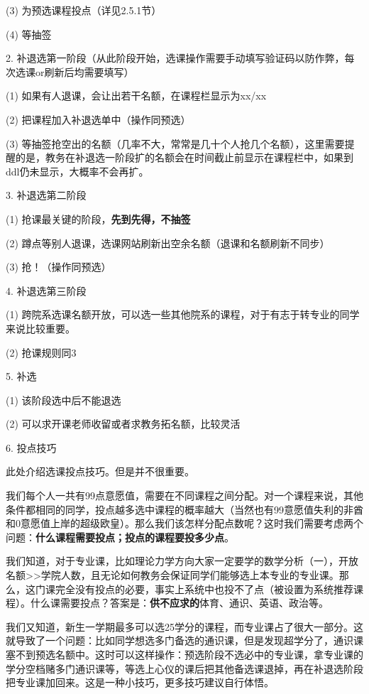 \documentclass[11pt,oneside]{book}
\begin{document}
(3) 为预选课程投点（详见2.5.1节）

(4) 等抽签

2. 补退选第一阶段（从此阶段开始，选课操作需要手动填写验证码以防作弊，每次选课or刷新后均需要填写）

(1) 如果有人退课，会让出若干名额，在课程栏显示为xx/xx

(2) 把课程加入补退选单中（操作同预选）

(3) 等抽签抢空出的名额（几率不大，常常是几十个人抢几个名额），这里需要提醒的是，教务在补退选一阶段扩的名额会在时间截止前显示在课程栏中，如果到ddl仍未显示，大概率不会再扩。

3. 补退选第二阶段

(1) 抢课最关键的阶段，\textbf{\textbf{先到先得，不抽签}}

(2) 蹲点等别人退课，选课网站刷新出空余名额（退课和名额刷新不同步）

(3) 抢！（操作同预选）

4. 补退选第三阶段

(1) 跨院系选课名额开放，可以选一些其他院系的课程，对于有志于转专业的同学来说比较重要。

(2) 抢课规则同3

5. 补选

(1) 该阶段选中后不能退选

(2) 可以求开课老师收留或者求教务拓名额，比较灵活

6. 投点技巧

此处介绍选课投点技巧。但是并不很重要。

我们每个人一共有99点意愿值，需要在不同课程之间分配。对一个课程来说，其他条件都相同的同学，投点越多选中课程的概率越大（当然也有99意愿值失利的非酋和0意愿值上岸的超级欧皇）。那么我们该怎样分配点数呢？这时我们需要考虑两个问题：\textbf{\textbf{什么课程需要投点；投点的课程要投多少点}}。

我们知道，对于专业课，比如理论力学方向大家一定要学的数学分析（一），开放名额>>学院人数，且无论如何教务会保证同学们能够选上本专业的专业课。那么，这门课完全没有投点的必要，事实上系统中也投不了点（被设置为系统推荐课程）。什么课需要投点？答案是：\textbf{\textbf{供不应求的}}体育、通识、英语、政治等。

我们又知道，新生一学期最多可以选25学分的课程，而专业课占了很大一部分。这就导致了一个问题：比如同学想选多门备选的通识课，但是发现超学分了，通识课塞不到预选名额中。这时可以这样操作：预选阶段不选必中的专业课，拿专业课的学分空档赌多门通识课等，等选上心仪的课后把其他备选课退掉，再在补退选阶段把专业课加回来。这是一种小技巧，更多技巧建议自行体悟。
\end{document}
